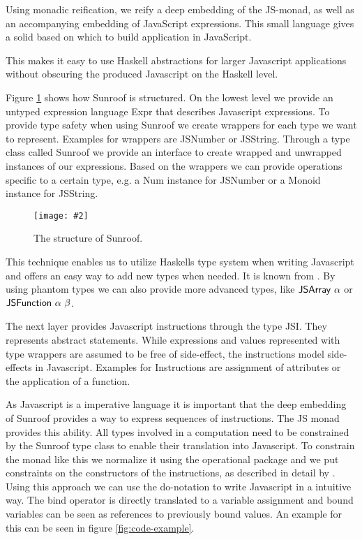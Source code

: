 \documentclass{llncs}
\newcommand{\Src}[1]{{\sf #1}}
\newcommand{\Figure}[3]{%
\begin{figure}[h]%
\vspace{-0.5cm}%
\begin{center}%
\texttt{[image: \#2]}%
\vspace{-0.5cm}%
\end{center}%
\caption{#3}%
\label{#1}%
\vspace{-0.5cm}%
\end{figure}%
}
\begin{document}
Using monadic reification, we reify a deep embedding of the JS-monad,
as well as an accompanying embedding of JavaScript expressions.
This small language gives a solid based on which to build application
in JavaScript.

This makes it easy to use Haskell abstractions for larger Javascript
applications without obscuring the produced Javascript on the Haskell
level. 


Figure \ref{fig:structure} shows how Sunroof is structured.
On the lowest level we provide an untyped expression language \Src{Expr}
that describes Javascript expressions. 
To provide type safety when using Sunroof we create wrappers for each 
type we want to represent. Examples for wrappers are \Src{JSNumber}
or \Src{JSString}. Through a type class
called \Src{Sunroof} we provide an interface to create wrapped and unwrapped
instances of our expressions. Based on the wrappers we can provide 
operations specific to a certain type, e.g. a \Src{Num} instance
for \Src{JSNumber} or a \Src{Monoid} instance for \Src{JSString}.

\Figure{fig:structure}{../figures/sunroof-structure.pdf}{The structure of Sunroof.}

This technique enables us to utilize 
Haskells type system when writing Javascript
and offers an easy way to add new types when needed.
It is known from 
\citet{Svenningsson:12:CombiningEmbedding}.
By using phantom types we can also provide more advanced types,
like $\Src{JSArray\ \alpha}$ or $\Src{JSFunction\ \alpha\ \beta}$.

The next layer provides Javascript instructions through the type \Src{JSI}.
They represents abstract statements. While expressions and values
represented with type wrappers are assumed to be free of side-effect,
the instructions model side-effects in Javascript. Examples for Instructions
are assignment of attributes or the application of a function.

As Javascript is a imperative language it is important that the deep embedding
of Sunroof provides a way to express sequences of instructions. 
The \Src{JS} monad provides this ability.
All types involved in a computation need to be constrained by the 
\Src{Sunroof} type class to enable their translation into Javascript.
To constrain the monad like this we normalize it using the operational package
\citep{Hackage:10:Operational,Apfelmus:10:Operational} and
we put constraints on the constructors of the instructions,
as described in detail by \citep{Sculthorpe:13:ConstrainedMonads}.
Using this approach we can use the do-notation to write Javascript 
in a intuitive way. The bind operator is directly translated to a variable
assignment and bound variables can be seen as references to previously 
bound values. An example for this can be seen in figure \ref{fig:code-example}.
\end{document}
